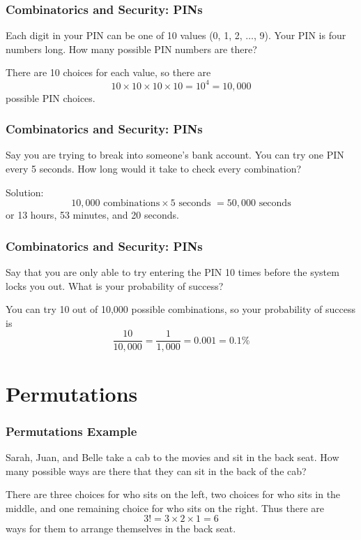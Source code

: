 \documentclass{beamer}
\newcommand{\<}{\langle}
\renewcommand{\>}{\rangle}
\begin{document}
\begin{frame}
\frametitle{Combinatorics and Security: PINs}

Each digit in your PIN can be one of 10 values (0, 1, 2, $\dots$, 9). Your PIN is four numbers long. How many possible PIN numbers are there?\newline

\pause

There are 10 choices for each value, so there are
\[
10 \times 10 \times 10 \times 10 = 10^4 = 10,000
\]
possible PIN choices.
\end{frame}

\begin{frame}
\frametitle{Combinatorics and Security: PINs}

Say you are trying to break into someone's bank account. You can try one PIN every 5 seconds. How long would it take to check every combination? \newline

\pause

Solution:
\[
10,000 \text{ combinations} \times 5 \text{ seconds } = 50,000 \text{ seconds}
\]
or 13 hours, 53 minutes, and 20 seconds. 
\end{frame}

\begin{frame}
\frametitle{Combinatorics and Security: PINs}

Say that you are only able to try entering the PIN 10 times before the system locks you out. What is your probability of success?\newline\pause

You can try 10 out of 10,000 possible combinations, so your probability of success is 
\[
\frac{10}{10,000} = \frac{1}{1,000} = 0.001 = 0.1\%
\]
\end{frame}


\section{Permutations}

\begin{frame}
\frametitle{Permutations Example}

Sarah, Juan, and Belle take a cab to the movies and sit in the back seat. How many possible ways are there that they can sit in the back of the cab?\newline

\pause

There are three choices for who sits on the left, two choices for who sits in the middle, and one remaining choice for who sits on the right. Thus there are
\[
3! = 3\times 2 \times 1 = 6
\]
ways for them to arrange themselves in the back seat.
\end{frame}
\end{document}

